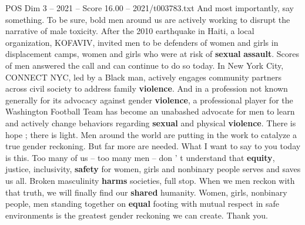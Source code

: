 \begin{textsample}{POS Dim 3 – 2021 – Score 16.00 – 2021/t003783.txt}
And most importantly, say something.
To be sure, bold men around us are actively working to disrupt the narrative of male toxicity.
After the 2010 earthquake in Haiti, a local organization, KOFAVIV, invited men to be defenders of women and girls in displacement camps, women and girls who were at risk of \textbf{sexual} \textbf{assault}.
Scores of men answered the call and can continue to do so today.
In New York City, CONNECT NYC, led by a Black man, actively engages community partners across civil society to address family \textbf{violence}.
And in a profession not known generally for its advocacy against gender \textbf{violence}, a professional player for the Washington Football Team has become an unabashed advocate for men to learn and actively change behaviors regarding \textbf{sexual} and physical \textbf{violence}.
There is hope ; there is light.
Men around the world are putting in the work to catalyze a true gender reckoning.
But far more are needed.
What I want to say to you today is this.
Too many of us -- too many men -- don ' t understand that \textbf{equity}, justice, inclusivity, \textbf{safety} for women, girls and nonbinary people serves and saves us all.
Broken masculinity \textbf{harms} societies, full stop.
When we men reckon with that truth, we will finally find our \textbf{shared} humanity.
Women, girls, nonbinary people, men standing together on \textbf{equal} footing with mutual respect in safe environments is the greatest gender reckoning we can create.
Thank you.

\end{textsample}

